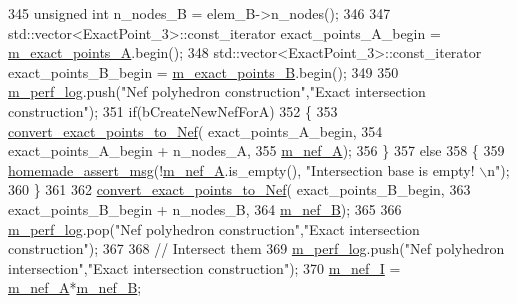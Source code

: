 \begin{DoxyCode}
345         \textcolor{keywordtype}{unsigned} \textcolor{keywordtype}{int} n\_nodes\_B = elem\_B->n\_nodes();
346 
347         std::vector<ExactPoint\_3>::const\_iterator exact\_points\_A\_begin = 
      \hyperlink{classcarl_1_1_intersection___tools_ad636117b292272044b252be62124eb0a}{m\_exact\_points\_A}.begin();
348         std::vector<ExactPoint\_3>::const\_iterator exact\_points\_B\_begin = 
      \hyperlink{classcarl_1_1_intersection___tools_a2c3b6211dd1f9b0aa5f2ac8ffc383182}{m\_exact\_points\_B}.begin();
349 
350         \hyperlink{classcarl_1_1_intersection___tools_afe18e6ca5fd12bae08efb98f69c71a48}{m\_perf\_log}.push(\textcolor{stringliteral}{"Nef polyhedron construction"},\textcolor{stringliteral}{"Exact intersection construction"});
351         \textcolor{keywordflow}{if}(bCreateNewNefForA)
352         \{
353             \hyperlink{classcarl_1_1_intersection___tools_af689c53cf00359c518234d8d070c4e53}{convert\_exact\_points\_to\_Nef}( exact\_points\_A\_begin,
354                                             exact\_points\_A\_begin + n\_nodes\_A,
355                                             \hyperlink{classcarl_1_1_intersection___tools_a66a33158af0779366d4109e96a10ddc4}{m\_nef\_A});
356         \}
357         \textcolor{keywordflow}{else}
358         \{
359             \hyperlink{common__header_8h_a593ccc80b790b2268653fcf6597bf451}{homemade\_assert\_msg}(!\hyperlink{classcarl_1_1_intersection___tools_a66a33158af0779366d4109e96a10ddc4}{m\_nef\_A}.is\_empty(), \textcolor{stringliteral}{"Intersection base is empty!
      \(\backslash\)n"});
360         \}
361 
362         \hyperlink{classcarl_1_1_intersection___tools_af689c53cf00359c518234d8d070c4e53}{convert\_exact\_points\_to\_Nef}( exact\_points\_B\_begin,
363                                         exact\_points\_B\_begin + n\_nodes\_B,
364                                         \hyperlink{classcarl_1_1_intersection___tools_a0b134a30452c8a767fc4265c7c0296a9}{m\_nef\_B});
365 
366         \hyperlink{classcarl_1_1_intersection___tools_afe18e6ca5fd12bae08efb98f69c71a48}{m\_perf\_log}.pop(\textcolor{stringliteral}{"Nef polyhedron construction"},\textcolor{stringliteral}{"Exact intersection construction"});
367 
368         \textcolor{comment}{// Intersect them}
369         \hyperlink{classcarl_1_1_intersection___tools_afe18e6ca5fd12bae08efb98f69c71a48}{m\_perf\_log}.push(\textcolor{stringliteral}{"Nef polyhedron intersection"},\textcolor{stringliteral}{"Exact intersection construction"});
370         \hyperlink{classcarl_1_1_intersection___tools_a47353dc1c374f45bf3dbaae667270cf3}{m\_nef\_I} = \hyperlink{classcarl_1_1_intersection___tools_a66a33158af0779366d4109e96a10ddc4}{m\_nef\_A}*\hyperlink{classcarl_1_1_intersection___tools_a0b134a30452c8a767fc4265c7c0296a9}{m\_nef\_B};

\end{DoxyCode}
